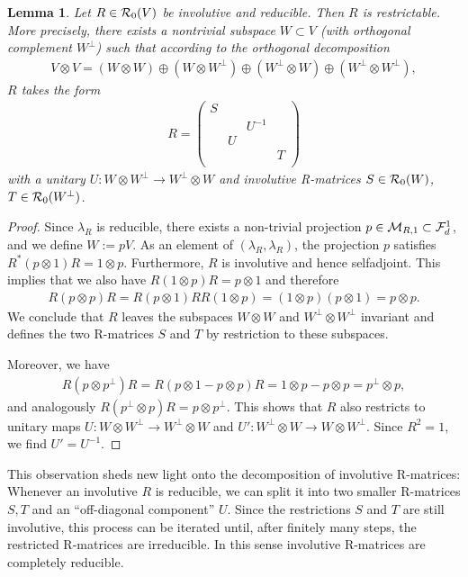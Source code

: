 \documentclass[12pt,a4paper]{amsart}
\numberwithin{equation}{section}
\newtheorem{lemma}[theorem]{Lemma}
\theoremstyle{remark}
\newcommand{\ot}{\otimes}
\newcommand{\la}{\lambda}
\newcommand{\CM}[0]{\mathcal{M}} \newcommand{\CN}[0]{\mathcal{N}}
\begin{document}
\begin{lemma}\label{lemma:restrictability}
    Let $R\in\mathcal{R}_0(V)$ be involutive and reducible. Then $R$ is restrictable. More precisely, there exists a nontrivial subspace $W\subset V$ (with orthogonal complement $W^\perp$) such that according to the orthogonal decomposition
 \begin{align}
  V\ot V = (W\ot W)\oplus(W\ot W^\perp)\oplus(W^\perp\ot W)\oplus(W^\perp\ot W^\perp),
 \end{align}
 $R$ takes the form
 \begin{align}\label{eq:Rsplit}
    R = 
    \left(
	\begin{array}{cccc}
		S\\
		&&U^{-1}\\
		&U\\
		&&&T\\
    \end{array}
    \right)
 \end{align}
 with a unitary $U:W\ot W^\perp\to W^\perp\ot W$ and involutive R-matrices $S\in\mathcal{R}_0(W)$, $T\in\mathcal{R}_0(W^\perp)$.  
\end{lemma}
\begin{proof}
    Since $\la_R$ is reducible, there exists a non-trivial projection $p\in\CM_{R,1}\subset\CF_d^1$, and we define $W:=pV$. As an element of $(\la_R,\la_R)$, the projection $p$ satisfies $R^*(p\ot1)R=1\ot p$. Furthermore, $R$ is involutive and hence selfadjoint. This implies that we also have $R(1\ot p)R=p\ot 1$ and therefore 
 \begin{align}
  R(p\ot p)R=R(p\ot1)RR(1\ot p)=(1\ot p)(p\ot 1)=p\ot p.
 \end{align}
 We conclude that $R$ leaves the subspaces $W\ot W$ and $W^\perp\ot W^\perp$ invariant and defines the two R-matrices $S$ and $T$ by restriction to these subspaces.
 
 Moreover, we have
 \begin{align}
  R(p\ot p^\perp)R=R(p\ot 1-p\ot p)R=1\ot p-p\ot p=p^\perp\ot p,
 \end{align}
 and analogously $R(p^\perp \ot p)R=p\ot p^\perp$. This shows that $R$ also restricts to unitary maps $U:W\ot W^\perp\to W^\perp\ot W$ and $U':W^\perp\ot W\to W\ot W^\perp$. Since $R^2=1$, we find $U'=U^{-1}$.
\end{proof}

This observation sheds new light onto the decomposition of involutive R-matrices: Whenever an involutive $R$ is reducible, we can split it into two smaller R-matrices $S,T$ and an ``off-diagonal component'' $U$. Since the restrictions $S$ and $T$ are still involutive, this process can be iterated until, after finitely many steps, the restricted R-matrices are irreducible. In this sense involutive R-matrices are completely reducible. 
\end{document}
